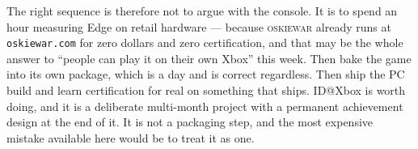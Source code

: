\documentclass[10pt,letterpaper,twocolumn]{article}
\newcommand{\game}{\textsc{oskiewar}}
\newcommand{\code}[1]{\texttt{#1}}
\begin{document}
The right sequence is therefore not to argue with the console. It is to spend an hour measuring Edge on retail hardware --- because \game{} already runs at \code{oskiewar.com} for zero dollars and zero certification, and that may be the whole answer to ``people can play it on their own Xbox'' this week. Then bake the game into its own package, which is a day and is correct regardless. Then ship the PC build and learn certification for real on something that ships. ID@Xbox is worth doing, and it is a deliberate multi-month project with a permanent achievement design at the end of it. It is not a packaging step, and the most expensive mistake available here would be to treat it as one.

\footnotesize


\end{document}
